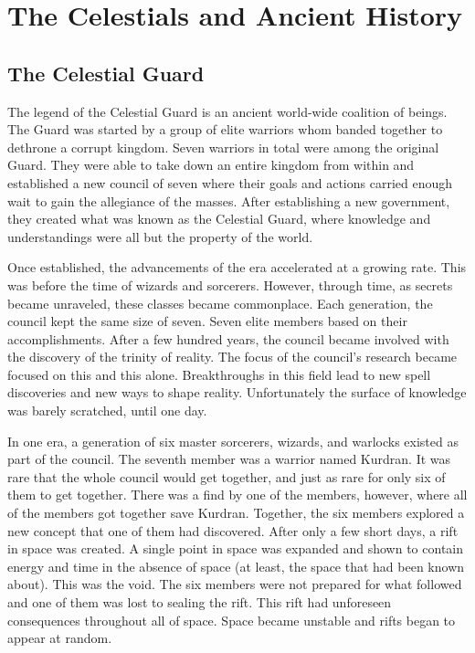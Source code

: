 \chapter{The Celestials and Ancient History}

\section{The Celestial Guard}

The legend of the Celestial Guard is an ancient world-wide coalition of beings. The Guard was started by a group of elite warriors whom banded together to dethrone a corrupt kingdom. Seven warriors in total were among the original Guard. They were able to take down an entire kingdom from within and established a new council of seven where their goals and actions carried enough wait to gain the allegiance of the masses. After establishing a new government, they created what was known as the Celestial Guard, where knowledge and understandings were all but the property of the world. 

Once established, the advancements of the era accelerated at a growing rate. This was before the time of wizards and sorcerers. However, through time, as secrets became unraveled, these classes became commonplace. Each generation, the council kept the same size of seven. Seven elite members based on their accomplishments. After a few hundred years, the council became involved with the discovery of the trinity of reality. The focus of the council's research became focused on this and this alone. Breakthroughs in this field lead to new spell discoveries and new ways to shape reality. Unfortunately the surface of knowledge was barely scratched, until one day.

In one era, a generation of six master sorcerers, wizards, and warlocks existed as part of the council. The seventh member was a warrior named Kurdran. It was rare that the whole council would get together, and just as rare for only six of them to get together. There was a find by one of the members, however, where all of the members got together save Kurdran. Together, the six members explored a new concept that one of them had discovered. After only a few short days, a rift in space was created. A single point in space was expanded and shown to contain energy and time in the absence of space (at least, the space that had been known about). This was the void. The six members were not prepared for what followed and one of them was lost to sealing the rift. This rift had unforeseen consequences throughout all of space. Space became unstable and rifts began to appear at random.

